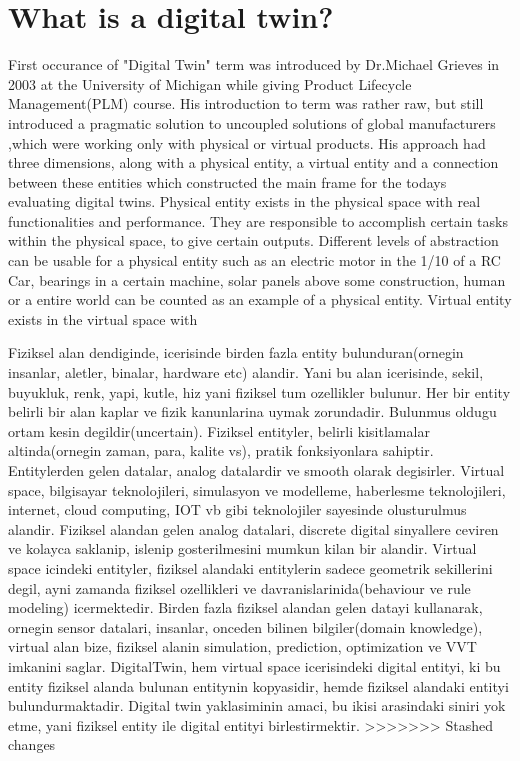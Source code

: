 \documentclass[9pt,conference]{IEEEtran}
\begin{document}
    \section{What is a digital twin?}
    First occurance of "Digital Twin" term  was introduced by Dr.Michael Grieves in 2003 at the University of Michigan while giving 
    Product Lifecycle Management(PLM) course.\cite{article} His introduction to term was rather raw, but still introduced a pragmatic solution to uncoupled solutions of global manufacturers
    ,which were working only with physical or virtual products.\newline
    His approach had three dimensions, along with a physical entity, a virtual entity and a connection between these entities which constructed the main frame for the todays evaluating  
    digital twins. \cite{article} \newline
    Physical entity exists in the physical space with real functionalities and performance. They are responsible to accomplish certain tasks within the physical space, to give certain outputs. 
    Different levels of abstraction can be usable for a physical entity such as an electric motor in the 1/10 of a RC Car, bearings in a certain machine, solar panels above some construction, human or a entire world can be counted as an example of a physical entity.
    Virtual entity exists in the virtual space with 

    Fiziksel alan dendiginde, icerisinde birden fazla entity bulunduran(ornegin insanlar, aletler, binalar, hardware etc) alandir. Yani bu alan icerisinde, sekil, buyukluk, renk, yapi, kutle, hiz yani fiziksel tum ozellikler bulunur. Her bir entity belirli bir alan kaplar ve fizik kanunlarina uymak zorundadir. Bulunmus oldugu ortam kesin degildir(uncertain). Fiziksel entityler, belirli kisitlamalar altinda(ornegin zaman, para, kalite vs), pratik fonksiyonlara sahiptir. Entitylerden gelen datalar, analog datalardir ve smooth olarak degisirler.
    Virtual space, bilgisayar teknolojileri, simulasyon ve modelleme, haberlesme teknolojileri, internet, cloud computing, IOT vb gibi teknolojiler sayesinde olusturulmus alandir. Fiziksel alandan gelen analog datalari, discrete digital sinyallere ceviren ve kolayca saklanip, islenip gosterilmesini mumkun kilan bir alandir. Virtual space icindeki entityler, fiziksel alandaki entitylerin sadece geometrik sekillerini degil, ayni zamanda fiziksel ozellikleri ve davranislarinida(behaviour ve rule modeling) icermektedir. Birden fazla fiziksel alandan gelen datayi kullanarak, ornegin sensor datalari, insanlar, onceden bilinen bilgiler(domain knowledge), virtual alan bize, fiziksel alanin simulation, prediction, optimization ve VVT imkanini saglar.
    DigitalTwin, hem virtual space icerisindeki digital entityi, ki bu entity fiziksel alanda bulunan entitynin kopyasidir, hemde fiziksel alandaki entityi bulundurmaktadir. Digital twin yaklasiminin amaci, bu ikisi arasindaki siniri yok etme, yani fiziksel entity ile digital entityi birlestirmektir.  
>>>>>>> Stashed changes
    
\end{document}
